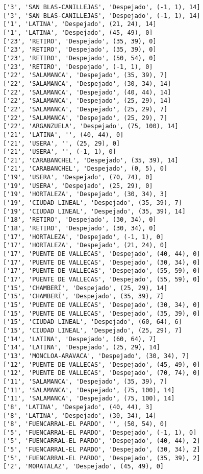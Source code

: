 \documentclass[11pt]{article}
\begin{document}
\begin{Verbatim}[commandchars=\\\{\}]
['3', 'SAN BLAS-CANILLEJAS', 'Despejado', (-1, 1), 14]
['3', 'SAN BLAS-CANILLEJAS', 'Despejado', (-1, 1), 14]
['1', 'LATINA', 'Despejado', (21, 24), 14]
['1', 'LATINA', 'Despejado', (45, 49), 0]
['23', 'RETIRO', 'Despejado', (35, 39), 0]
['23', 'RETIRO', 'Despejado', (35, 39), 0]
['23', 'RETIRO', 'Despejado', (50, 54), 0]
['23', 'RETIRO', 'Despejado', (-1, 1), 0]
['22', 'SALAMANCA', 'Despejado', (35, 39), 7]
['22', 'SALAMANCA', 'Despejado', (30, 34), 14]
['22', 'SALAMANCA', 'Despejado', (40, 44), 14]
['22', 'SALAMANCA', 'Despejado', (25, 29), 14]
['22', 'SALAMANCA', 'Despejado', (25, 29), 7]
['22', 'SALAMANCA', 'Despejado', (25, 29), 7]
['22', 'ARGANZUELA', 'Despejado', (75, 100), 14]
['21', 'LATINA', '', (40, 44), 0]
['21', 'USERA', '', (25, 29), 0]
['21', 'USERA', '', (-1, 1), 0]
['21', 'CARABANCHEL', 'Despejado', (35, 39), 14]
['21', 'CARABANCHEL', 'Despejado', (0, 5), 0]
['19', 'USERA', 'Despejado', (70, 74), 0]
['19', 'USERA', 'Despejado', (25, 29), 0]
['19', 'HORTALEZA', 'Despejado', (30, 34), 3]
['19', 'CIUDAD LINEAL', 'Despejado', (35, 39), 7]
['19', 'CIUDAD LINEAL', 'Despejado', (35, 39), 14]
['18', 'RETIRO', 'Despejado', (30, 34), 0]
['18', 'RETIRO', 'Despejado', (30, 34), 0]
['17', 'HORTALEZA', 'Despejado', (-1, 1), 0]
['17', 'HORTALEZA', 'Despejado', (21, 24), 0]
['17', 'PUENTE DE VALLECAS', 'Despejado', (40, 44), 0]
['17', 'PUENTE DE VALLECAS', 'Despejado', (30, 34), 0]
['17', 'PUENTE DE VALLECAS', 'Despejado', (55, 59), 0]
['17', 'PUENTE DE VALLECAS', 'Despejado', (55, 59), 0]
['15', 'CHAMBERÍ', 'Despejado', (25, 29), 14]
['15', 'CHAMBERÍ', 'Despejado', (35, 39), 7]
['15', 'PUENTE DE VALLECAS', 'Despejado', (30, 34), 0]
['15', 'PUENTE DE VALLECAS', 'Despejado', (35, 39), 0]
['15', 'CIUDAD LINEAL', 'Despejado', (60, 64), 6]
['15', 'CIUDAD LINEAL', 'Despejado', (25, 29), 7]
['14', 'LATINA', 'Despejado', (60, 64), 7]
['14', 'LATINA', 'Despejado', (25, 29), 14]
['13', 'MONCLOA-ARAVACA', 'Despejado', (30, 34), 7]
['12', 'PUENTE DE VALLECAS', 'Despejado', (45, 49), 0]
['12', 'PUENTE DE VALLECAS', 'Despejado', (70, 74), 0]
['11', 'SALAMANCA', 'Despejado', (35, 39), 7]
['11', 'SALAMANCA', 'Despejado', (75, 100), 14]
['11', 'SALAMANCA', 'Despejado', (75, 100), 14]
['8', 'LATINA', 'Despejado', (40, 44), 3]
['8', 'LATINA', 'Despejado', (30, 34), 14]
['8', 'FUENCARRAL-EL PARDO', '', (50, 54), 0]
['5', 'FUENCARRAL-EL PARDO', 'Despejado', (-1, 1), 0]
['5', 'FUENCARRAL-EL PARDO', 'Despejado', (40, 44), 2]
['5', 'FUENCARRAL-EL PARDO', 'Despejado', (30, 34), 2]
['5', 'FUENCARRAL-EL PARDO', 'Despejado', (35, 39), 2]
['2', 'MORATALAZ', 'Despejado', (45, 49), 0]

\end{Verbatim}
\end{document}
